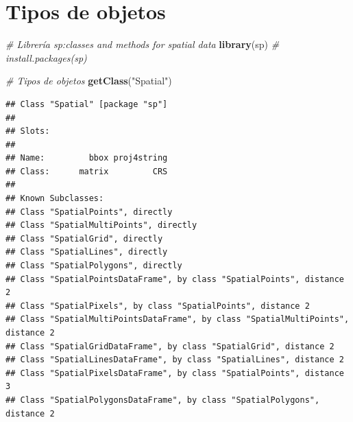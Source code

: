 \documentclass[
]{book}
\newenvironment{Shaded}{\begin{snugshade}}{\end{snugshade}}
\newcommand{\CommentTok}[1]{\textcolor[rgb]{0.56,0.35,0.01}{\textit{#1}}}
\newcommand{\FunctionTok}[1]{\textcolor[rgb]{0.13,0.29,0.53}{\textbf{#1}}}
\newcommand{\NormalTok}[1]{#1}
\newcommand{\StringTok}[1]{\textcolor[rgb]{0.31,0.60,0.02}{#1}}
\theoremstyle{break}
\theoremstyle{definition}
\theoremstyle{definition}
\theoremstyle{definition}
\theoremstyle{definition}
\theoremstyle{remark}
\begin{document}
\section{Tipos de objetos}\label{tipos-de-objetos}

\begin{Shaded}
\begin{Highlighting}[]
\CommentTok{\# Librería sp:classes and methods for spatial data}
\FunctionTok{library}\NormalTok{(sp) }\CommentTok{\# install.packages(\textquotesingle{}sp\textquotesingle{})}

\CommentTok{\# Tipos de objetos}
\FunctionTok{getClass}\NormalTok{(}\StringTok{"Spatial"}\NormalTok{)}
\end{Highlighting}
\end{Shaded}

\begin{verbatim}
## Class "Spatial" [package "sp"]
## 
## Slots:
##                               
## Name:         bbox proj4string
## Class:      matrix         CRS
## 
## Known Subclasses: 
## Class "SpatialPoints", directly
## Class "SpatialMultiPoints", directly
## Class "SpatialGrid", directly
## Class "SpatialLines", directly
## Class "SpatialPolygons", directly
## Class "SpatialPointsDataFrame", by class "SpatialPoints", distance 2
## Class "SpatialPixels", by class "SpatialPoints", distance 2
## Class "SpatialMultiPointsDataFrame", by class "SpatialMultiPoints", distance 2
## Class "SpatialGridDataFrame", by class "SpatialGrid", distance 2
## Class "SpatialLinesDataFrame", by class "SpatialLines", distance 2
## Class "SpatialPixelsDataFrame", by class "SpatialPoints", distance 3
## Class "SpatialPolygonsDataFrame", by class "SpatialPolygons", distance 2
\end{verbatim}
\end{document}
